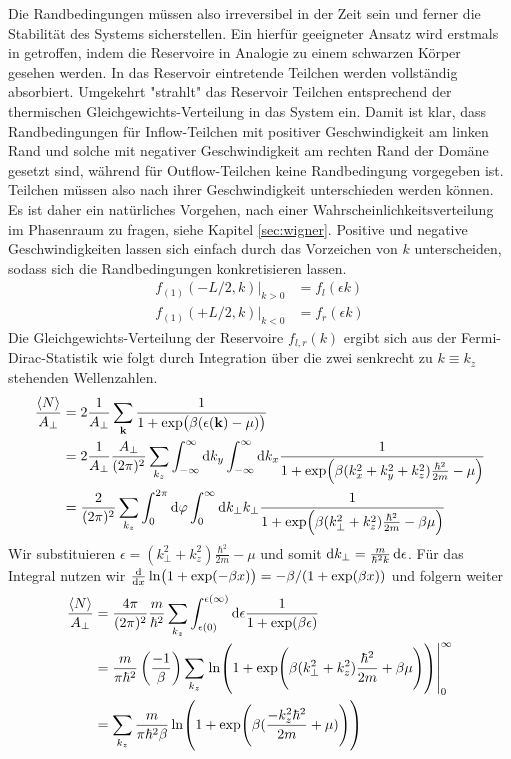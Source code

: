 Die Randbedingungen müssen also irreversibel in der Zeit sein und ferner die Stabilität des Systems sicherstellen. Ein hierfür geeigneter Ansatz wird erstmals in \cite{frensley2} getroffen, indem die Reservoire in Analogie zu einem schwarzen Körper gesehen werden. In das Reservoir eintretende Teilchen werden vollständig absorbiert. Umgekehrt "strahlt" das Reservoir Teilchen entsprechend der thermischen Gleichgewichts-Verteilung in das System ein. Damit ist klar, dass Randbedingungen für Inflow-Teilchen mit positiver Geschwindigkeit am linken Rand und solche mit negativer Geschwindigkeit am rechten Rand der Domäne gesetzt sind, während für Outflow-Teilchen keine Randbedingung vorgegeben ist. Teilchen müssen also nach ihrer Geschwindigkeit unterschieden werden können.
Es ist daher ein natürliches Vorgehen, nach einer Wahrscheinlichkeitsverteilung im Phasenraum zu fragen, siehe Kapitel \ref{sec:wigner}.
Positive und negative Geschwindigkeiten lassen sich einfach durch das Vorzeichen von $k$ unterscheiden, sodass sich die Randbedingungen konkretisieren lassen.
\begin{align}
  f_{(1)}(-L/2,k)|_{k>0} &= f_l(\epsilon{k}) \\
  f_{(1)}(+L/2,k)|_{k<0} &= f_r(\epsilon{k})
\end{align}
Die Gleichgewichts-Verteilung der Reservoire $f_{l,r}(k)$ ergibt sich aus der Fermi-Dirac-Statistik wie folgt durch Integration über die zwei senkrecht zu $k\equiv k_z$ stehenden Wellenzahlen.
\begin{align}
  \frac{\expval{N}}{A_{\perp}} &= 2\frac{1}{A_{\perp}}\sum_{\vb{k}}\frac{1}{1+\exp(\beta(\epsilon(\vb{k}) - \mu))} \\
    &= 2\frac{1}{A_{\perp}}  \frac{A_{\perp}}{(2\pi)^2} \sum_{k_z}\int_{-\infty}^{\infty} \mathop{}\!\mathrm{d} k_y \int_{-\infty}^{\infty} \mathop{}\!\mathrm{d} k_x \frac{1}{1+\exp(\beta(k_x^2 + k_y^2 + k_z^2)\frac{\hbar^2}{2m} - \mu)} \\
    &= \frac{2}{(2\pi)^2} \sum_{k_z} \int_0^{2\pi} \mathop{}\!\mathrm{d} \varphi \int_0^{\infty} \mathop{}\!\mathrm{d} k_{\perp} k_{\perp} \frac{1}{1+\exp(\beta(k_{\perp}^2 + k_z^2)\frac{\hbar^2}{2m} - \beta \mu)}
\end{align}
Wir substituieren $\epsilon = (k^2_{\perp} + k_z^2)\frac{\hbar^2}{2m} - \mu$ und somit $\mathop{}\!\mathrm{d} k_\perp = \frac{m}{\hbar^2 k}\mathop{}\!\mathrm{d} \epsilon$. Für das Integral nutzen wir $\frac{\mathrm{d}}{\mathrm{d}x}\ln(1+\exp(-\beta x)) = -\beta / (1+\exp(\beta x))$ und folgern weiter
\begin{align}
  \frac{\expval{N}}{A_{\perp}} &= \frac{4\pi}{(2\pi)^2} \frac{m}{\hbar^2} \sum_{k_z} \int_{\epsilon(0)}^{{\epsilon(\infty)}} \mathop{}\!\mathrm{d} \epsilon \frac{1}{1+\exp(\beta\epsilon)} \\
    &= \frac{m}{\pi\hbar^2}\left( \frac{-1}{\beta}\right) \sum_{k_z} \left.\ln(1+\exp(\beta(k_{\perp}^2 + k_z^2)\frac{\hbar^2}{2m} + \beta\mu))\right|_0^{\infty} \\
    &= \sum_{k_z} \frac{m}{\pi\hbar^2\beta} \ln(1+\exp(\beta(\frac{- k_z^2\hbar^2}{2m} + \mu)))
\end{align}

